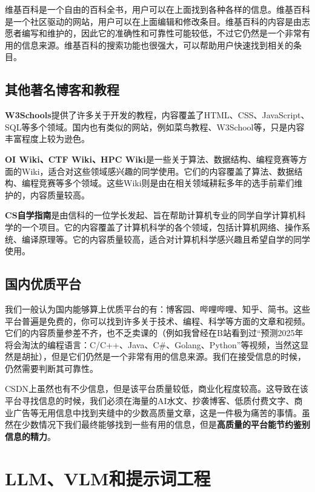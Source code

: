 维基百科是一个自由的百科全书，用户可以在上面找到各种各样的信息。维基百科是一个社区驱动的网站，用户可以在上面编辑和修改条目。维基百科的内容是由志愿者编写和维护的，因此它的准确性和可靠性可能较低，不过它仍然是一个非常有用的信息来源。维基百科的搜索功能也很强大，可以帮助用户快速找到相关的条目。

\subsection{其他著名博客和教程}

\textbf{W3Schools}提供了许多关于开发的教程，内容覆盖了HTML、CSS、JavaScript、SQL等多个领域。国内也有类似的网站，例如菜鸟教程、W3School等，只是内容丰富程度上较为逊色。

\textbf{OI Wiki、CTF Wiki、HPC Wiki}是一些关于算法、数据结构、编程竞赛等方面的Wiki，适合对这些领域感兴趣的同学使用。它们的内容覆盖了算法、数据结构、编程竞赛等多个领域。这些Wiki则是由在相关领域耕耘多年的选手前辈们维护的，内容质量较高。

\textbf{CS自学指南}是由信科的一位学长发起、旨在帮助计算机专业的同学自学计算机科学的一个项目。它的内容覆盖了计算机科学的各个领域，包括计算机网络、操作系统、编译原理等。它的内容质量较高，适合对计算机科学感兴趣且希望自学的同学使用。

\subsection{国内优质平台}

我们一般认为国内能够算上优质平台的有：博客园、哔哩哔哩、知乎、简书。这些平台普遍是免费的，你可以找到许多关于技术、编程、科学等方面的文章和视频。它们的内容质量参差不齐，也不乏卖课的（例如我曾经在B站看到过“预测2025年将会淘汰的编程语言：C/C++、Java、C\#、Golang、Python”等视频，当然这显然是胡扯），但是它们仍然是一个非常有用的信息来源。我们在接受信息的时候，仍然需要判断其可靠性。

\begin{note}
  CSDN上虽然也有不少信息，但是该平台质量较低，商业化程度较高。这导致在该平台寻找信息的时候，我们必须在海量的AI水文、抄袭博客、低质付费文字、商业广告等无用信息中找到夹缝中的少数高质量文章，这是一件极为痛苦的事情。虽然在少数情况下我们最终能够找到一些有用的信息，但是\textbf{高质量的平台能节约鉴别信息的精力}。
\end{note}

\section{LLM、VLM和提示词工程}\label{sec:llm}

